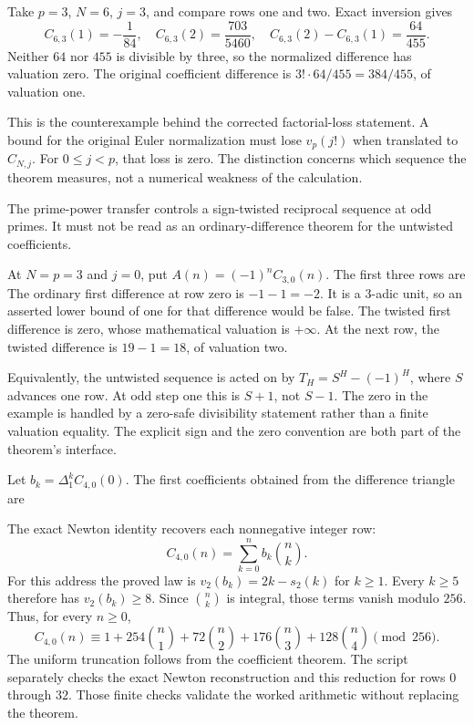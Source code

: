 Take $p=3$, $N=6$, $j=3$, and compare rows one and two. Exact inversion gives
\[
 C_{6,3}(1)=-\frac1{84},\quad
 C_{6,3}(2)=\frac{703}{5460},\quad
 C_{6,3}(2)-C_{6,3}(1)=\frac{64}{455}.
\]
Neither $64$ nor $455$ is divisible by three, so the normalized difference has valuation zero. The original coefficient difference is $3!\cdot64/455=384/455$, of valuation one.

This is the counterexample behind the corrected factorial-loss statement. A bound for the original Euler normalization must lose $v_p(j!)$ when translated to $C_{N,j}$. For $0\le j<p$, that loss is zero. The distinction concerns which sequence the theorem measures, not a numerical weakness of the calculation.

The prime-power transfer controls a sign-twisted reciprocal sequence at odd primes. It must not be read as an ordinary-difference theorem for the untwisted coefficients.

At $N=p=3$ and $j=0$, put $A(n)=(-1)^nC_{3,0}(n)$. The first three rows are
The ordinary first difference at row zero is $-1-1=-2$. It is a $3$-adic unit, so an asserted lower bound of one for that difference would be false. The twisted first difference is zero, whose mathematical valuation is $+\infty$. At the next row, the twisted difference is $19-1=18$, of valuation two.

Equivalently, the untwisted sequence is acted on by $T_H=S^H-(-1)^H$, where $S$ advances one row. At odd step one this is $S+1$, not $S-1$. The zero in the example is handled by a zero-safe divisibility statement rather than a finite valuation equality. The explicit sign and the zero convention are both part of the theorem's interface.

Let $b_k=\Delta_1^kC_{4,0}(0)$. The first coefficients obtained from the difference triangle are

The exact Newton identity recovers each nonnegative integer row:
\[
 C_{4,0}(n)=\sum_{k=0}^{n}b_k\binom nk.
\]
For this address the proved law is $v_2(b_k)=2k-s_2(k)$ for $k\ge1$. Every $k\ge5$ therefore has $v_2(b_k)\ge8$. Since $\binom nk$ is integral, those terms vanish modulo $256$. Thus, for every $n\ge0$,
\[
 C_{4,0}(n)\equiv1+254\binom n1+72\binom n2+
 176\binom n3+128\binom n4\pmod{256}.
\]
The uniform truncation follows from the coefficient theorem. The script separately checks the exact Newton reconstruction and this reduction for rows $0$ through $32$. Those finite checks validate the worked arithmetic without replacing the theorem.


